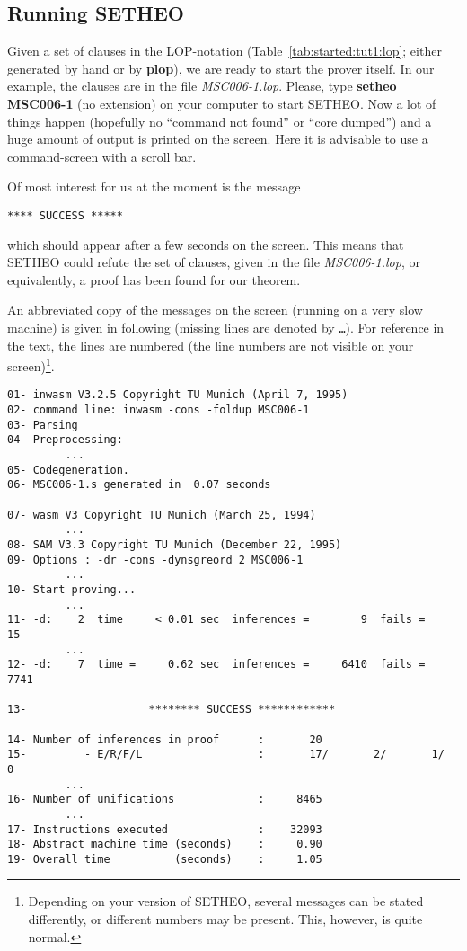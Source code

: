 \subsection{Running SETHEO}

Given a set of clauses in the LOP-notation (Table~\ref{tab:started:tut1:lop};
either generated by hand
or by {\bf plop}), we are ready to start the prover itself.
In our example, the clauses are in the file {\em MSC006-1.lop}.
Please, type {\bf setheo MSC006-1} (no extension) on your computer to start
SETHEO. Now a lot of things happen (hopefully no ``command not found'' or
``core dumped'') and a huge amount of output is printed on the
screen. Here it is advisable to use a command-screen with a scroll bar.

Of most interest for us at the moment is the message
\begin{center}
{\tt ***** SUCCESS *****}
\end{center}
 which should appear after a few seconds 
on the screen.
This means that SETHEO could refute the set of clauses, given in the
file {\em MSC006-1.lop}, or equivalently, a proof has been found for
our theorem.

An abbreviated copy of the messages on the screen (running on a very
slow machine) is given in following
(missing lines are denoted by  {\tt \ldots}). For reference in the
text, the lines are numbered (the line numbers are not visible on
your screen)\footnote{
	Depending on your version of SETHEO, several messages
	can be stated differently, or different numbers may be
	present. This, however, is quite normal.
	}.

\begin{verbatim}
01- inwasm V3.2.5 Copyright TU Munich (April 7, 1995) 
02- command line: inwasm -cons -foldup MSC006-1
03- Parsing 
04- Preprocessing: 
         ...
05- Codegeneration.
06- MSC006-1.s generated in  0.07 seconds

07- wasm V3 Copyright TU Munich (March 25, 1994)
         ...
08- SAM V3.3 Copyright TU Munich (December 22, 1995)
09- Options : -dr -cons -dynsgreord 2 MSC006-1 
         ...
10- Start proving...
         ...
11- -d:    2  time     < 0.01 sec  inferences =        9  fails =       15
         ...
12- -d:    7  time =     0.62 sec  inferences =     6410  fails =     7741

13-                   ******** SUCCESS ************

14- Number of inferences in proof      :       20
15-         - E/R/F/L                  :       17/       2/       1/       0
         ...
16- Number of unifications             :     8465
         ...
17- Instructions executed              :    32093
18- Abstract machine time (seconds)    :     0.90
19- Overall time          (seconds)    :     1.05
\end{verbatim}


